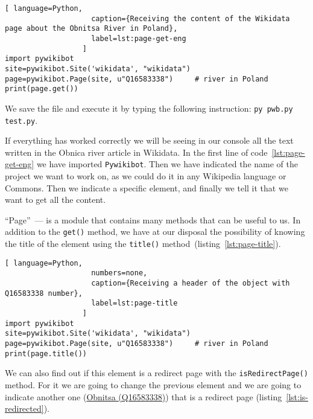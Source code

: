%
\begin{lstlisting}[ language=Python,
                    caption={Receiving the content of the Wikidata page about the Obnitsa River in Poland},
                    label=lst:page-get-eng
                  ]
import pywikibot
site=pywikibot.Site('wikidata', "wikidata")
page=pywikibot.Page(site, u"Q16583338")     # river in Poland
print(page.get())
\end{lstlisting}

We save the file and execute it by typing the following instruction: \lstinline|py pwb.py test.py|.

If everything has worked correctly we will be seeing in our console all the text written in the Obnica river article  in Wikidata. 
In the first line of code~\ref{lst:page-get-eng} we have imported \lstinline|Pywikibot|. 
Then we have indicated the name of the project we want to work on, as we could do it in any Wikipedia language or Commons. Then we indicate a specific element, and finally we tell it that we want to get all the content.


``Page''~--- is a module that contains many methods that can be useful to us. 
%
In addition to the \lstinline|get()| method, we have at our disposal the possibility of knowing the title of the element using the \lstinline|title()| method~(listing~\ref{lst:page-title}).

\begin{lstlisting}[ language=Python,
                    numbers=none,
                    caption={Receiving a header of the object with Q16583338 number},
                    label=lst:page-title
                  ]
import pywikibot
site=pywikibot.Site('wikidata', "wikidata")
page=pywikibot.Page(site, u"Q16583338")     # river in Poland
print(page.title())
\end{lstlisting}

We can also find out if this element is a redirect page with the \lstinline|isRedirectPage()| method. 
For it we are going to change the previous element and we are going to indicate another one  
(\href{https://www.wikidata.org/w/index.php?title=Q16583333&redirect=no}{Obnitsa (Q16583338)}) that is a redirect page (listing~\ref{lst:is-redirected}).

